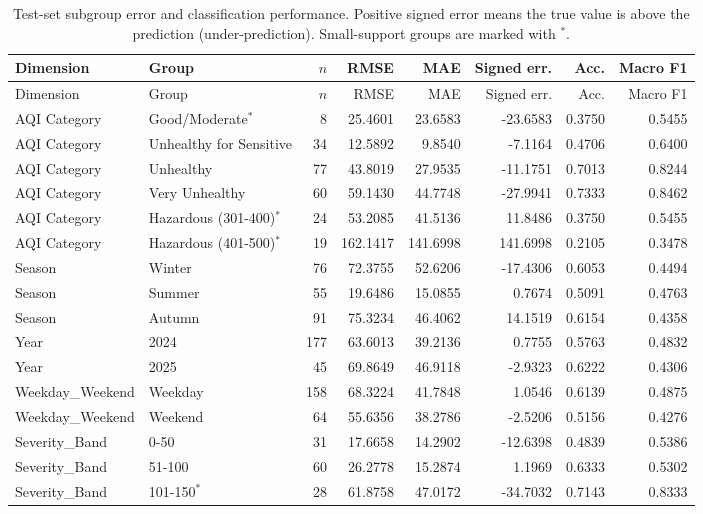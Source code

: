 {\footnotesize
\setlength{\tabcolsep}{4pt}
\begin{longtable}{@{}llrrrrrr@{}}
\caption{Test-set subgroup error and classification performance. Positive signed error means the true value is above the prediction (under-prediction). Small-support groups are marked with $^{*}$.}\label{tab:bias-test}\\
\toprule
Dimension & Group & $n$ & RMSE & MAE & Signed err. & Acc. & Macro F1 \\
\midrule
\endfirsthead
\toprule
Dimension & Group & $n$ & RMSE & MAE & Signed err. & Acc. & Macro F1 \\
\midrule
\endhead
AQI Category & Good/Moderate$^{*}$ & 8 & 25.4601 & 23.6583 & -23.6583 & 0.3750 & 0.5455 \\
AQI Category & Unhealthy for Sensitive & 34 & 12.5892 & 9.8540 & -7.1164 & 0.4706 & 0.6400 \\
AQI Category & Unhealthy & 77 & 43.8019 & 27.9535 & -11.1751 & 0.7013 & 0.8244 \\
AQI Category & Very Unhealthy & 60 & 59.1430 & 44.7748 & -27.9941 & 0.7333 & 0.8462 \\
AQI Category & Hazardous (301-400)$^{*}$ & 24 & 53.2085 & 41.5136 & 11.8486 & 0.3750 & 0.5455 \\
AQI Category & Hazardous (401-500)$^{*}$ & 19 & 162.1417 & 141.6998 & 141.6998 & 0.2105 & 0.3478 \\
Season & Winter & 76 & 72.3755 & 52.6206 & -17.4306 & 0.6053 & 0.4494 \\
Season & Summer & 55 & 19.6486 & 15.0855 & 0.7674 & 0.5091 & 0.4763 \\
Season & Autumn & 91 & 75.3234 & 46.4062 & 14.1519 & 0.6154 & 0.4358 \\
Year & 2024 & 177 & 63.6013 & 39.2136 & 0.7755 & 0.5763 & 0.4832 \\
Year & 2025 & 45 & 69.8649 & 46.9118 & -2.9323 & 0.6222 & 0.4306 \\
Weekday\_Weekend & Weekday & 158 & 68.3224 & 41.7848 & 1.0546 & 0.6139 & 0.4875 \\
Weekday\_Weekend & Weekend & 64 & 55.6356 & 38.2786 & -2.5206 & 0.5156 & 0.4276 \\
Severity\_Band & 0-50 & 31 & 17.6658 & 14.2902 & -12.6398 & 0.4839 & 0.5386 \\
Severity\_Band & 51-100 & 60 & 26.2778 & 15.2874 & 1.1969 & 0.6333 & 0.5302 \\
Severity\_Band & 101-150$^{*}$ & 28 & 61.8758 & 47.0172 & -34.7032 & 0.7143 & 0.8333 \\

\end{longtable}}
